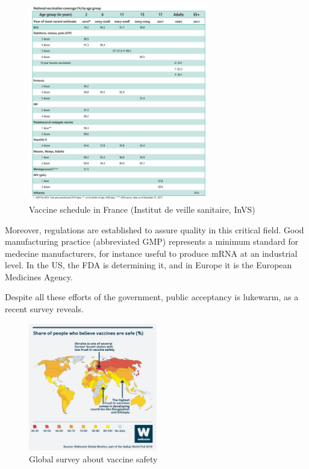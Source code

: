 \documentclass{article}
\begin{document}
            \begin{figure}
                \centering
                \includegraphics[width=0.7\textwidth]{imgs/VaccineSchedule.JPG}
                \caption{Vaccine schedule in France (Institut de veille sanitaire, InVS) \autocite{spfAssessmentVaccinationCoverage}}
                \label{fig:vacAgenda}
            \end{figure}

            Moreover, regulations are established to assure quality in this critical field.
                Good manufacturing practice (abbreviated GMP) represents a minimum standard for medecine manufacturers,
                for instance useful to produce mRNA at an industrial level. In the US, the FDA is determining it, and in Europe
                it is the European Medicines Agency.

            Despite all these efforts of the government, public acceptancy is lukewarm, as a recent survey reveals.
                    
                \begin{figure}
                    \centering
                    \includegraphics[width=0.5\textwidth]{imgs/VaccineHesitancy.png}
                    \caption{Global survey about vaccine safety \autocite{SurveyRevealsEuropean}}
                    \label{fig:responses8}
                \end{figure}
\end{document}
